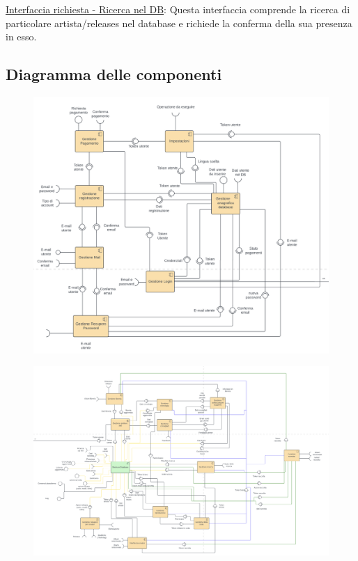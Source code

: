 \documentclass[a4paper,12pt]{article}
\begin{document}
\underline{Interfaccia richiesta - Ricerca nel DB}: Questa interfaccia comprende la ricerca di particolare artista/releases nel database e richiede la conferma della sua presenza in esso.

\subsection{Diagramma delle componenti}

\begin{figure}[htp]
    \centering
    \includegraphics[width=\textwidth]{diagrams/component-1.png}
\end{figure}

\begin{figure}[htp]
    \centering
    \includegraphics[width=\textwidth]{diagrams/component-2.png}
\end{figure}
\end{document}

